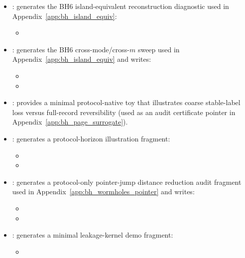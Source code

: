 \begin{sloppypar}
\begin{itemize}
\item {}: generates the BH6 island-equivalent reconstruction diagnostic used in Appendix~\ref{app:bh_island_equiv}:
\begin{itemize}
\item {}
\end{itemize}
\item {}: generates the BH6 cross-mode/cross-$m$ sweep used in Appendix~\ref{app:bh_island_equiv} and writes:
\begin{itemize}
\item {}
\item {}
\end{itemize}
\item {}: provides a minimal protocol-native toy that illustrates coarse stable-label loss versus full-record reversibility (used as an audit certificate pointer in Appendix~\ref{app:bh_page_surrogate}).
\item {}: generates a protocol-horizon illustration fragment:
\begin{itemize}
\item {}
\item {}
\end{itemize}
\item {}: generates a protocol-only pointer-jump distance reduction audit fragment used in Appendix~\ref{app:bh_wormholes_pointer} and writes:
\begin{itemize}
\item {}
\item {}
\end{itemize}
\item {}: generates a minimal leakage-kernel demo fragment:
\begin{itemize}
\item {}
\end{itemize}

\end{itemize}
\end{sloppypar}
